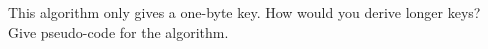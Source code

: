 This algorithm only gives a one-byte key. How would you
derive longer keys? Give pseudo-code for the algorithm.
